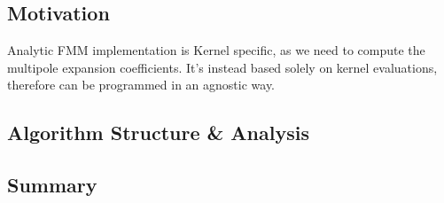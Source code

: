 \subsection{Motivation}

Analytic FMM implementation is Kernel specific, as we need to compute the
multipole expansion coefficients. It's instead based solely on kernel evaluations,
therefore can be programmed in an agnostic way.

\subsection{Algorithm Structure \& Analysis}

\subsection{Summary}